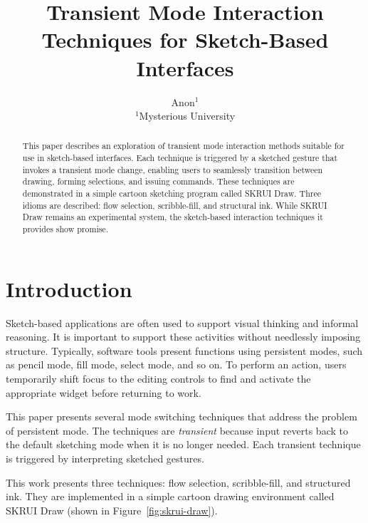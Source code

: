 \documentclass{egpubl}
\title[Transient Mode Techniques]
      {Transient Mode Interaction Techniques for Sketch-Based Interfaces}
\author[Anon]
       {Anon$^{1}$ \\
         $^1$Mysterious University\\
       }
\begin{document}
\maketitle

\begin{abstract}

This paper describes an exploration of transient mode interaction
methods suitable for use in sketch-based interfaces. Each technique is
triggered by a sketched gesture that invokes a transient mode change,
enabling users to seamlessly transition between drawing, forming
selections, and issuing commands. These techniques are demonstrated in
a simple cartoon sketching program called SKRUI Draw. Three idioms are
described: flow selection, scribble-fill, and structural ink. While
SKRUI Draw remains an experimental system, the sketch-based
interaction techniques it provides show promise.

\begin{classification} %
\end{classification}

\end{abstract}

\section{Introduction}

Sketch-based applications are often used to support visual thinking
and informal reasoning. It is important to support these activities
without needlessly imposing structure. Typically, software tools
present functions using persistent modes, such as pencil mode, fill
mode, select mode, and so on. To perform an action, users temporarily
shift focus to the editing controls to find and activate the
appropriate widget before returning to work.

This paper presents several mode switching techniques that address the
problem of persistent mode. The techniques are \emph{transient}
because input reverts back to the default sketching mode when it is no
longer needed. Each transient technique is triggered by interpreting
sketched gestures.

This work presents three techniques: flow selection, scribble-fill,
and structured ink. They are implemented in a simple cartoon drawing
environment called SKRUI Draw (shown in Figure~\ref{fig:skrui-draw}).
\end{document}
